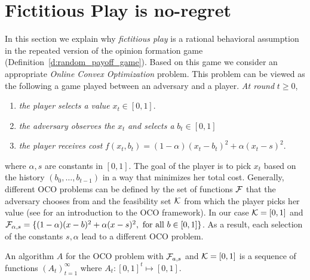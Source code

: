\section{Fictitious Play is no-regret}\label{s:fictitious_noregret}

In this section we explain why \emph{fictitious play} 
is a rational behavioral assumption in
the repeated version of the opinion formation 
game (Definition~\ref{d:random_payoff_game}). 
Based on this game we consider an appropriate 
\emph{Online Convex Optimization} problem. This 
problem can be viewed
as the following a game played between an 
adversary and a player. \emph{At round }$t\geq 0$,
\begin{enumerate}
  \item \emph{the player selects a value }$x_t \in [0,1]$.
  \item \emph{the adversary observes the }$x_t$ \emph{and selects a} $b_t \in [0,1]$
  \item \emph{the player receives cost} $f(x_t,b_t)=(1-\alpha)(x_t-b_t)^2 + \alpha(x_t -s)^2$.
\end{enumerate}
where $\alpha,s$ are constants in $[0,1]$. The goal of 
the player is to pick $x_t$ based on the history
$(b_0,\ldots,b_{t-1})$ in a way that minimizes her total cost. 
Generally, different OCO problems can be defined by the set of functions
$\mathcal{F}$ that the adversary chooses from and the feasibility 
set $\mathcal{K}$ from which the player picks her value (see \cite{Haz16}
for an introduction to the OCO framework).
In our case $\mathcal{K}=[0,1]$ and $\mathcal{F}_{\alpha,s} = \{(1-\alpha)(x-b)^2 + 
\alpha(x -s)^2,~\text{for all }b \in [0,1]\}$.
As a result, each selection of the 
constants $s,\alpha$ lead to a different OCO problem.

\begin{definition}\label{d:OCO_algo}
An algorithm $A$ for the OCO problem with $\mathcal{F}_{a,s}$ and
$\mathcal{K}=[0,1]$ is a sequence of functions $(A_t)_{t=1}^\infty$ where $A_t:[0,1]^t \mapsto [0,1]$.
\end{definition}

